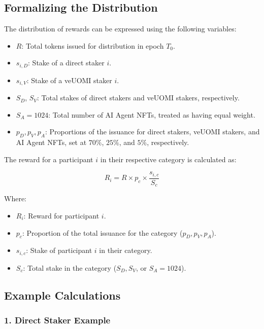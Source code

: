 \documentclass{article}
\begin{document}
\subsection*{Formalizing the Distribution}

The distribution of rewards can be expressed using the following variables:

\begin{itemize}
    \item \( R \): Total tokens issued for distribution in epoch \( T_0 \).
    \item \( s_{i,D} \): Stake of a direct staker \( i \).
    \item \( s_{i,V} \): Stake of a veUOMI staker \( i \).
    \item \( S_D \), \( S_V \): Total stakes of direct stakers and veUOMI stakers, respectively.
    \item \( S_A = 1024 \): Total number of AI Agent NFTs, treated as having equal weight.
    \item \( p_D, p_V, p_A \): Proportions of the issuance for direct stakers, veUOMI stakers, and AI Agent NFTs, set at \( 70\%\), \( 25\%\), and \( 5\%\), respectively.
\end{itemize}

The reward for a participant \( i \) in their respective category is calculated as:

\[
R_i = R \times p_c \times \frac{s_{i,c}}{S_c}
\]

Where:
\begin{itemize}
    \item \( R_i \): Reward for participant \( i \).
    \item \( p_c \): Proportion of the total issuance for the category (\( p_D, p_V, p_A \)).
    \item \( s_{i,c} \): Stake of participant \( i \) in their category.
    \item \( S_c \): Total stake in the category (\( S_D, S_V \), or \( S_A = 1024 \)).
\end{itemize}

\subsection*{Example Calculations}

\subsubsection*{1. Direct Staker Example}
\end{document}
